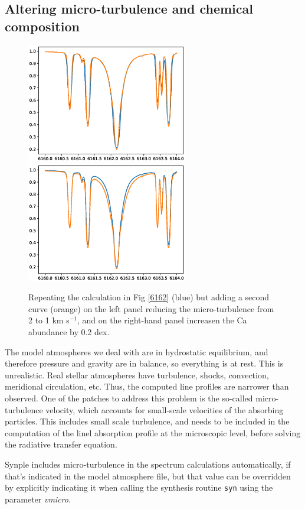 \documentclass[]{article}
\begin{document}
\subsection{Altering micro-turbulence and chemical composition}
\label{abundances}

\begin{figure}[t!]
\centering
\includegraphics[width=7cm]{Figure_2a.ps}
\includegraphics[width=7cm]{Figure_2b.ps}
\caption{Repeating the calculation in Fig \ref{6162} (blue) but adding a second curve (orange) on the left panel reducing the micro-turbulence from 2 to 1 km s$^{-1}$, and on the right-hand panel increasen the Ca abundance by 0.2 dex.
\label{micro-abu}
}
\end{figure}


The model atmospheres we deal with are in hydrostatic equilibrium, and therefore pressure and gravity are in balance, so everything is at rest. This is unrealistic. Real stellar atmospheres have turbulence, shocks, convection, meridional circulation, etc. Thus, the computed line profiles are narrower than observed. One of the patches to address this problem is the so-called micro-turbulence velocity, which accounts for small-scale velocities of the absorbing particles. This includes small scale turbulence, and needs to be included in the computation of the linel absorption profile at the microscopic level, before solving the radiative transfer equation.

Synple includes micro-turbulence in the spectrum calculations automatically, if that's indicated in the model atmosphere file, but that value can be overridden by explicitly indicating it when calling the synthesis routine {\tt syn} using the parameter {\it vmicro}.
\end{document}
